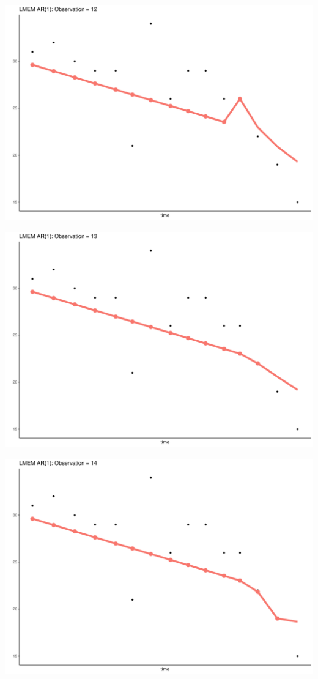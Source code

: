 \documentclass[
  ignorenonframetext,
]{beamer}
\begin{document}
\begin{frame}{}
\protect\hypertarget{section-26}{}
\includegraphics{Prez4_files/figure-beamer/unnamed-chunk-14-12.pdf}
\end{frame}

\begin{frame}{}
\protect\hypertarget{section-27}{}
\includegraphics{Prez4_files/figure-beamer/unnamed-chunk-14-13.pdf}
\end{frame}

\begin{frame}{}
\protect\hypertarget{section-28}{}
\includegraphics{Prez4_files/figure-beamer/unnamed-chunk-14-14.pdf}
\end{frame}
\end{document}
